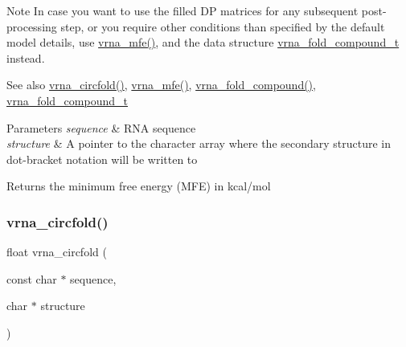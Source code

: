 \begin{DoxyNote}{Note}
In case you want to use the filled DP matrices for any subsequent post-\/processing step, or you require other conditions than specified by the default model details, use \hyperlink{group__mfe__fold_gabd3b147371ccf25c577f88bbbaf159fd}{vrna\+\_\+mfe()}, and the data structure \hyperlink{group__fold__compound_ga1b0cef17fd40466cef5968eaeeff6166}{vrna\+\_\+fold\+\_\+compound\+\_\+t} instead.
\end{DoxyNote}
\begin{DoxySeeAlso}{See also}
\hyperlink{group__mfe__fold__single_gaf973483d8acbc8cc9aacfc8a9b7f0074}{vrna\+\_\+circfold()}, \hyperlink{group__mfe__fold_gabd3b147371ccf25c577f88bbbaf159fd}{vrna\+\_\+mfe()}, \hyperlink{group__fold__compound_ga6601d994ba32b11511b36f68b08403be}{vrna\+\_\+fold\+\_\+compound()}, \hyperlink{group__fold__compound_ga1b0cef17fd40466cef5968eaeeff6166}{vrna\+\_\+fold\+\_\+compound\+\_\+t}
\end{DoxySeeAlso}

\begin{DoxyParams}{Parameters}
{\em sequence} & R\+NA sequence \\
\hline
{\em structure} & A pointer to the character array where the secondary structure in dot-\/bracket notation will be written to \\
\hline
\end{DoxyParams}
\begin{DoxyReturn}{Returns}
the minimum free energy (M\+FE) in kcal/mol 
\end{DoxyReturn}
\mbox{\label{group__mfe__fold__single_gaf973483d8acbc8cc9aacfc8a9b7f0074}} 
\subsubsection{\texorpdfstring{vrna\+\_\+circfold()}{vrna\_circfold()}}
{\footnotesize\ttfamily float vrna\+\_\+circfold (\begin{DoxyParamCaption}\item[{const char $\ast$}]{sequence,  }\item[{char $\ast$}]{structure }\end{DoxyParamCaption})}



